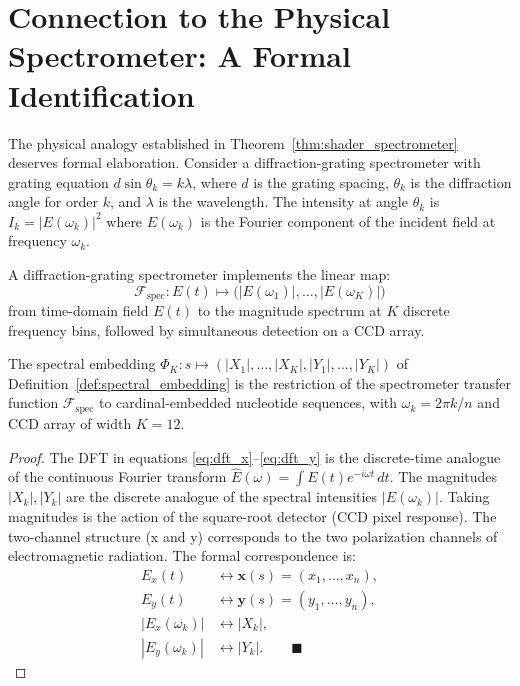 \section{Connection to the Physical Spectrometer: A Formal Identification}
\label{sec:physical_spectrometer_connection}

The physical analogy established in Theorem~\ref{thm:shader_spectrometer}
deserves formal elaboration. Consider a diffraction-grating spectrometer with
grating equation $d\sin\theta_k = k\lambda$, where $d$ is the grating spacing,
$\theta_k$ is the diffraction angle for order $k$, and $\lambda$ is the wavelength.
The intensity at angle $\theta_k$ is $I_k = |E(\omega_k)|^2$ where
$E(\omega_k)$ is the Fourier component of the incident field at frequency $\omega_k$.

\begin{definition}
\label{def:spectrometer_transfer}
A diffraction-grating spectrometer implements the linear map:
\begin{equation}
  \mathcal{F}_{\mathrm{spec}} : E(t) \longmapsto \bigl(|E(\omega_1)|, \ldots, |E(\omega_K)|\bigr)
  \label{eq:spectrometer_map}
\end{equation}
from time-domain field $E(t)$ to the magnitude spectrum at $K$ discrete
frequency bins, followed by simultaneous detection on a CCD array.
\end{definition}

\begin{proposition}
\label{prop:formal_equivalence}
The spectral embedding $\Phi_K : s \mapsto (|X_1|,\ldots,|X_K|, |Y_1|,\ldots,|Y_K|)$
of Definition~\ref{def:spectral_embedding} is the restriction of the spectrometer
transfer function $\mathcal{F}_{\mathrm{spec}}$ to cardinal-embedded nucleotide
sequences, with $\omega_k = 2\pi k / n$ and CCD array of width $K=12$.
\end{proposition}

\begin{proof}
The DFT in equations \eqref{eq:dft_x}--\eqref{eq:dft_y} is the discrete-time
analogue of the continuous Fourier transform $\hat{E}(\omega) = \int E(t)e^{-i\omega t}\,dt$.
The magnitudes $|X_k|, |Y_k|$ are the discrete analogue of the spectral
intensities $|E(\omega_k)|$. Taking magnitudes is the action of the square-root
detector (CCD pixel response). The two-channel structure (x and y) corresponds
to the two polarization channels of electromagnetic radiation. The formal
correspondence is:
\begin{align}
  E_x(t) &\longleftrightarrow \mathbf{x}(s) = (x_1,\ldots,x_n), \\
  E_y(t) &\longleftrightarrow \mathbf{y}(s) = (y_1,\ldots,y_n), \\
  |E_x(\omega_k)| &\longleftrightarrow |X_k|, \\
  |E_y(\omega_k)| &\longleftrightarrow |Y_k|. \qquad\blacksquare
\end{align}
\end{proof}

